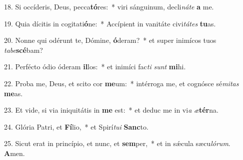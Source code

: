 18. Si occíderis, Deus, pecca\textbf{tó}res:~*  viri sánguinum, decli\textit{ná}\textit{te} \textbf{a} me.\

19. Quia dícitis in cogitati\textbf{ó}ne:~*  Accípient in vanitáte civi\textit{tá}\textit{tes} \textbf{tu}as.\

20. Nonne qui odérunt te, Dómine, \textbf{ó}deram?~*  et super inimícos tuos \textit{ta}\textit{be}\textbf{scé}bam?\

21. Perfécto ódio óderam \textbf{il}los:~*  et inimíci fac\textit{ti} \textit{sunt} \textbf{mi}hi.\

22. Proba me, Deus, et scito cor \textbf{me}um:~*  intérroga me, et cognósce sé\textit{mi}\textit{tas} \textbf{me}as.\

23. Et vide, si via iniquitátis in \textbf{me} est:~*  et deduc me in vi\textit{a} \textit{æ}\textbf{tér}na.\

24. Glória Patri, et \textbf{Fí}lio,~*  et Spirí\textit{tu}\textit{i} \textbf{Sanc}to.\

25. Sicut erat in princípio, et nunc, et \textbf{sem}per,~*  et in sǽcula sæcu\textit{ló}\textit{rum}. \textbf{A}men.\

